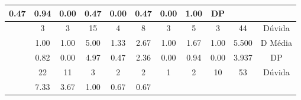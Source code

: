 \begin{table}[htbp]
\begin{tabular}{|ccccccccccc|}
		\multicolumn{1}{c|}{0.47} &
		\multicolumn{1}{c|}{0.94} &
		\multicolumn{1}{c|}{0.00} &
		\multicolumn{1}{c|}{0.47} &
		\multicolumn{1}{c|}{0.00} &
		\multicolumn{1}{c|}{0.47} &
		\multicolumn{1}{c|}{0.00} &
		\multicolumn{1}{c|}{1.00} &
		DP \\ \hline
		\rowcolor[HTML]{D9D9D9} 
		\multicolumn{1}{|c|}{\cellcolor[HTML]{F2F2F2}} &
		\multicolumn{1}{c|}{\cellcolor[HTML]{D9D9D9}3} &
		\multicolumn{1}{c|}{\cellcolor[HTML]{D9D9D9}3} &
		\multicolumn{1}{c|}{\cellcolor[HTML]{D9D9D9}15} &
		\multicolumn{1}{c|}{\cellcolor[HTML]{D9D9D9}4} &
		\multicolumn{1}{c|}{\cellcolor[HTML]{D9D9D9}8} &
		\multicolumn{1}{c|}{\cellcolor[HTML]{D9D9D9}3} &
		\multicolumn{1}{c|}{\cellcolor[HTML]{D9D9D9}5} &
		\multicolumn{1}{c|}{\cellcolor[HTML]{D9D9D9}3} &
		\multicolumn{1}{c|}{\cellcolor[HTML]{D9D9D9}44} &
		Dúvida \\ \cline{2-11} 
		\multicolumn{1}{|c|}{\cellcolor[HTML]{F2F2F2}} &
		\multicolumn{1}{c|}{1.00} &
		\multicolumn{1}{c|}{1.00} &
		\multicolumn{1}{c|}{5.00} &
		\multicolumn{1}{c|}{1.33} &
		\multicolumn{1}{c|}{2.67} &
		\multicolumn{1}{c|}{1.00} &
		\multicolumn{1}{c|}{1.67} &
		\multicolumn{1}{c|}{1.00} &
		\multicolumn{1}{c|}{5.500} &
		D Média \\ \cline{2-11} 
		\rowcolor[HTML]{D9D9D9} 
		\multicolumn{1}{|c|}{\multirow{-3}{*}{\cellcolor[HTML]{F2F2F2}\textbf{B03}}} &
		\multicolumn{1}{c|}{\cellcolor[HTML]{D9D9D9}0.82} &
		\multicolumn{1}{c|}{\cellcolor[HTML]{D9D9D9}0.00} &
		\multicolumn{1}{c|}{\cellcolor[HTML]{D9D9D9}4.97} &
		\multicolumn{1}{c|}{\cellcolor[HTML]{D9D9D9}0.47} &
		\multicolumn{1}{c|}{\cellcolor[HTML]{D9D9D9}2.36} &
		\multicolumn{1}{c|}{\cellcolor[HTML]{D9D9D9}0.00} &
		\multicolumn{1}{c|}{\cellcolor[HTML]{D9D9D9}0.94} &
		\multicolumn{1}{c|}{\cellcolor[HTML]{D9D9D9}0.00} &
		\multicolumn{1}{c|}{\cellcolor[HTML]{D9D9D9}3.937} &
		DP \\ \hline
		\multicolumn{1}{|c|}{\cellcolor[HTML]{F2F2F2}} &
		\multicolumn{1}{c|}{22} &
		\multicolumn{1}{c|}{11} &
		\multicolumn{1}{c|}{3} &
		\multicolumn{1}{c|}{2} &
		\multicolumn{1}{c|}{2} &
		\multicolumn{1}{c|}{1} &
		\multicolumn{1}{c|}{2} &
		\multicolumn{1}{c|}{10} &
		\multicolumn{1}{c|}{53} &
		Dúvida \\ \cline{2-11} 
		\rowcolor[HTML]{D9D9D9} 
		\multicolumn{1}{|c|}{\cellcolor[HTML]{F2F2F2}} &
		\multicolumn{1}{c|}{\cellcolor[HTML]{D9D9D9}7.33} &
		\multicolumn{1}{c|}{\cellcolor[HTML]{D9D9D9}3.67} &
		\multicolumn{1}{c|}{\cellcolor[HTML]{D9D9D9}1.00} &
		\multicolumn{1}{c|}{\cellcolor[HTML]{D9D9D9}0.67} &
		\multicolumn{1}{c|}{\cellcolor[HTML]{D9D9D9}0.67} &

\end{tabular}
\end{table}
